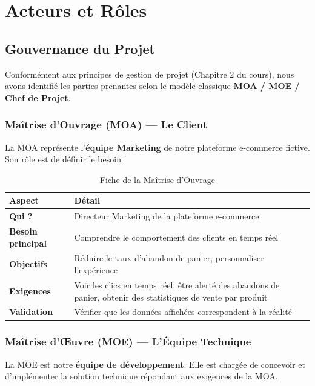 \chapter{Acteurs et Rôles}

\section{Gouvernance du Projet}

Conformément aux principes de gestion de projet (Chapitre 2 du cours), nous avons identifié les parties prenantes selon le modèle classique \textbf{MOA / MOE / Chef de Projet}.

\subsection{Maîtrise d'Ouvrage (MOA) --- Le Client}

La MOA représente l'\textbf{équipe Marketing} de notre plateforme e-commerce fictive. Son rôle est de définir le besoin :

\begin{table}[H]
\centering
\begin{tabularx}{\textwidth}{L{4cm} X}
\toprule
\textbf{\color{primarycolor}Aspect} & \textbf{\color{primarycolor}Détail} \\
\midrule
\textbf{Qui ?} & Directeur Marketing de la plateforme e-commerce \\
\addlinespace[0.1cm]
\textbf{Besoin principal} & Comprendre le comportement des clients en temps réel \\
\addlinespace[0.1cm]
\textbf{Objectifs} & Réduire le taux d'abandon de panier, personnaliser l'expérience \\
\addlinespace[0.1cm]
\textbf{Exigences} & Voir les clics en temps réel, être alerté des abandons de panier, obtenir des statistiques de vente par produit \\
\addlinespace[0.1cm]
\textbf{Validation} & Vérifier que les données affichées correspondent à la réalité \\
\bottomrule
\end{tabularx}
\caption{Fiche de la Maîtrise d'Ouvrage}
\end{table}

\subsection{Maîtrise d'Œuvre (MOE) --- L'Équipe Technique}

La MOE est notre \textbf{équipe de développement}. Elle est chargée de concevoir et d'implémenter la solution technique répondant aux exigences de la MOA.

